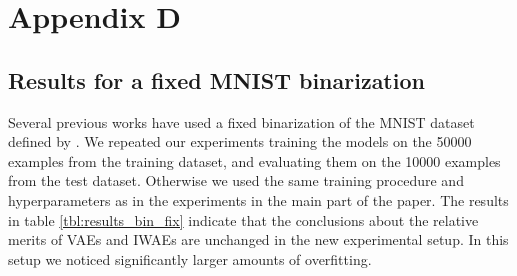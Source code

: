 \documentclass{article} %
\begin{document}
\section*{Appendix D}
\label{app:binarization}

\subsection*{Results for a fixed MNIST binarization}

Several previous works have used a fixed binarization of the MNIST dataset defined by \cite{binarization}. We repeated our experiments training the models on the 50000 examples from the training dataset, and evaluating them on the 10000 examples from the test dataset. Otherwise we used the same training procedure and hyperparameters as in the experiments in the main part of the paper. The results in table \ref{tbl:results_bin_fix} indicate that the conclusions about the relative merits of VAEs and IWAEs are unchanged in the new experimental setup. In this setup we noticed significantly larger amounts of overfitting.

\vspace{2ex}
\end{document}
